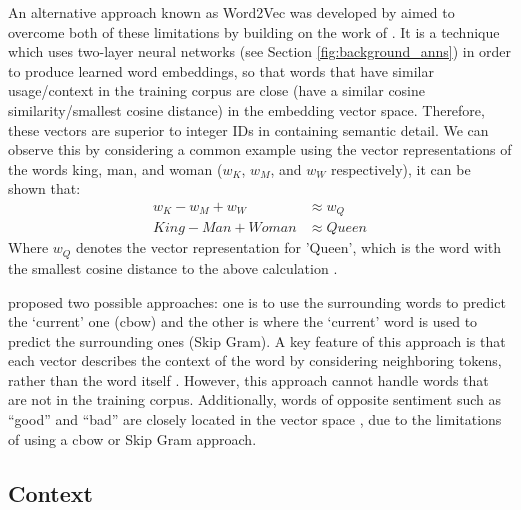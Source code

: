 An alternative approach known as Word2Vec was developed by \citet{mikolov2013efficient} aimed to overcome both of these limitations by building on the work of \citet{bengio2000neural}. It is a technique which uses two-layer neural networks (see Section \ref{fig:background_anns}) in order to produce learned word embeddings, so that words that have similar usage/context in the training corpus are close (have a similar cosine similarity/smallest cosine distance) in the embedding vector space. Therefore, these vectors are superior to integer IDs in containing semantic detail. We can observe this by considering a common example using the vector representations of the words king, man, and woman ($w_K$, $w_M$, and $w_W$ respectively), it can be shown that:
\begin{equation*}
    \begin{aligned}
        w_K - w_M + w_W &\approx w_Q \\
        King - Man + Woman &\approx Queen
    \end{aligned}
\end{equation*}
Where $w_Q$ denotes the vector representation for 'Queen', which is the word with the smallest cosine distance to the above calculation \citep{allen2019analogies}.

\cite{mikolov2013efficient} proposed two possible approaches: one is to use the surrounding words to predict the `current' one (\acrfull{cbow}) and the other is where the `current' word is used to predict the surrounding ones (Skip Gram). A key feature of this approach is that each vector describes the context of the word by considering neighboring tokens, rather than the word itself \citep{li2018introduction}. However, this approach cannot handle words that are not in the training corpus. Additionally, words of opposite sentiment such as “good” and “bad” are closely located in the vector space \citep{sivakumar2020review}, due to the limitations of using a \acrshort{cbow} or Skip Gram approach.


\subsection{Context}
\label{sec:embeddings_context}

